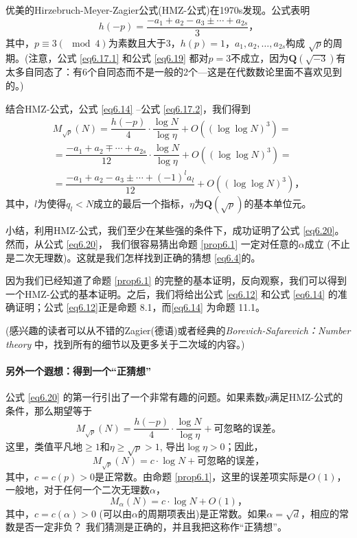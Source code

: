 \documentclass[11pt,a4paper]{article}
\theoremstyle{definition}
\newcommand{\refeq}[1]{公式 \ref{#1}}
\newcommand{\refprop}[1]{命题 \ref{#1}}
\numberwithin{equation}{section}
\newcommand{\comma}{\text{，}}
\newcommand{\qfield}[1]{$ \mathbf{Q}\left(\sqrt{#1}\right) $}%
\newcommand{\mymod}[3]{$ #1\equiv#2\left(\!\!\mod#3\right) $}
\begin{document}
优美的Hirzebruch-Meyer-Zagier公式(HMZ-公式)在1970s发现。公式表明
\begin{equation}\label{eq6.19}
h(-p)=\dfrac{-a_{1}+a_{2}-a_{3}\pm\cdots+a_{2s}}{3}\comma
\end{equation}
其中，\mymod{p}{3}{4}为素数且大于$ 3 $，$ h(p)=1 $，$ a_{1},a_{2},\ldots,a_{2s} $构成 $ \sqrt{p} $的周期。(注意，\refeq{eq6.17.1} 和\refeq{eq6.19} 都对$ p=3 $不成立，因为\qfield{-3}有太多自同态了：有6个自同态而不是一般的2个---这是在代数数论里面不喜欢见到的。)

结合HMZ-公式，\refeq{eq6.14} --\refeq{eq6.17.2}，我们得到
\begin{equation}\label{eq6.20}
	\begin{split}
	M_{\sqrt{p}}(N)=\dfrac{h(-p)}{4}\cdot\dfrac{\log{N}}{\log{\eta}}+O((\log\log{N})^{3})=
	\\=\dfrac{-a_{1}+a_{2}\mp\cdots+a_{2s}}{12}\cdot\dfrac{\log N}{\log\eta}+O((\log\log{N})^{3})=
	\\=\dfrac{-a_{1}+a_{2}-a_{3}\pm\cdots+(-1)^{l}a_{l}}{12}+O((\log\log{N})^{3})\comma
	\end{split}
\end{equation}
其中，$ l $为使得$ q_{l}<N $成立的最后一个指标，$ \eta $为\qfield{p}的基本单位元。

小结，利用HMZ-公式，我们至少在某些强的条件下，成功证明了\refeq{eq6.20}。然而，从\refeq{eq6.20}， 我们很容易猜出\refprop{prop6.1} 一定对任意的$ \alpha $成立 (不止是二次无理数)。这就是我们怎样找到正确的猜想 \ref{eq6.4}的。

因为我们已经知道了\refprop{prop6.1} 的完整的基本证明，反向观察，我们可以得到一个HMZ-公式的基本证明。之后，我们将给出\refeq{eq6.12} 和\refeq{eq6.14} 的准确证明；\refeq{eq6.12}正是命题 8.1，而\ref{eq6.14} 为命题 11.1。

(感兴趣的读者可以从不错的Zagier\cite{Za4}(德语)或者经典的\textit{Borevich-Safarevich：Number theory} 中，找到所有的细节以及更多关于二次域的内容。)

\paragraph{另外一个遐想：得到一个``正猜想''} \refeq{eq6.20} 的第一行引出了一个非常有趣的问题。如果素数$ p  $满足HMZ-公式的条件，那么期望等于
\[ M_{\sqrt{p}}(N)=\dfrac{h(-p)}{4}\cdot\dfrac{\log{N}}{\log{\eta}}+\text{可忽略的误差。}\]
这里，类值平凡地$ \geq1 $和$ \eta\geq\sqrt{p}>1 $, 导出$ \log\eta>0 $；因此，
\[  M_{\sqrt{p}}(N)=c\cdot\log{N}+\text{可忽略的误差，}\]
其中，$ c=c(p)>0 $是正常数。由\refprop{prop6.1}，这里的误差项实际是$ O(1) $，一般地，对于任何一个二次无理数$ \alpha $，
\[  M_{\alpha}(N)=c\cdot\log{N}+O(1)\comma\]
其中，$ c=c(\alpha)>0 $ (可以由$ \alpha $的周期项表出)是正常数。如果$ \alpha=\sqrt{d} $，相应的常数是否一定非负？ 我们猜测是正确的，并且我把这称作``正猜想''。
\end{document}
